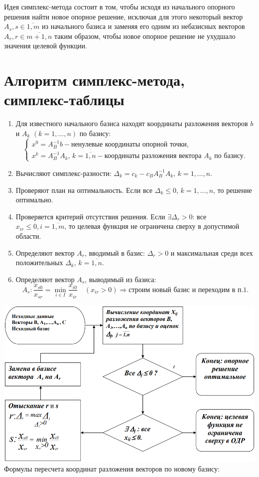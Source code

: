 \documentclass[17pt]{extarticle}
\begin{document}
Идея симплекс-метода состоит в том, чтобы исходя из начального опорного решения найти новое опорное
решение, исключая для этого некоторый вектор $A_s, s \in \overline{1,m}$ из начального базиса и заменяя его
одним из небазисных векторов $A_r, r \in \overline{m + 1, n}$
таким образом, чтобы новое опорное решение не ухудшало значения целевой функции.


\section{Алгоритм симплекс-метода, симплекс-таблицы}
\begin{enumerate}
    \item Для известного начального базиса находят координаты разложения векторов \( b \) и \( A_k \) \( (k = 1, \ldots, n) \) по базису:
          \[
              \begin{cases}
                  x^0 = A_B^{-1}b - \text{ненулевые координаты опорной точки}, \\
                  x^k = A_B^{-1}A_k, \, k = \overline{1,n} - \text{координаты разложения вектора } A_k \text{ по базису}.
              \end{cases}
          \]
    \item Вычисляют симплекс-разности: \(\Delta_k = c_k - c_B A_B^{-1}A_k, \, k = 1, \ldots, n. \)
    \item Проверяют план на оптимальность. Если все \(\Delta_k \leq 0\), \( k = 1, \ldots, n \), то решение оптимально.
    \item Проверяется критерий отсутствия решения.
          Если \(\exists \Delta_r > 0\): все \( x_{ir} \leq 0, i = \overline{1,m} \), то целевая функция не ограничена сверху в допустимой области.
    \item Определяют вектор \( A_r \), вводимый в базис: \(\Delta_r > 0\)
          и максимальная среди всех положительных \(\Delta_k\), \( k = \overline{1,n} \).

    \item Определяют вектор \( A_s \), выводимый из базиса:
          \[
              A_s : \frac{x_{s0}}{x_{sr}} = \min_{i \in I} \frac{x_{i0}}{x_{ir}} \quad (x_{ir} > 0) \Rightarrow \text{строим новый базис и переходим в п.1.}
          \]
\end{enumerate}
\includegraphics[width=1\textwidth]{9.png}
Формулы пересчета координат разложения векторов по новому базису:
\end{document}
